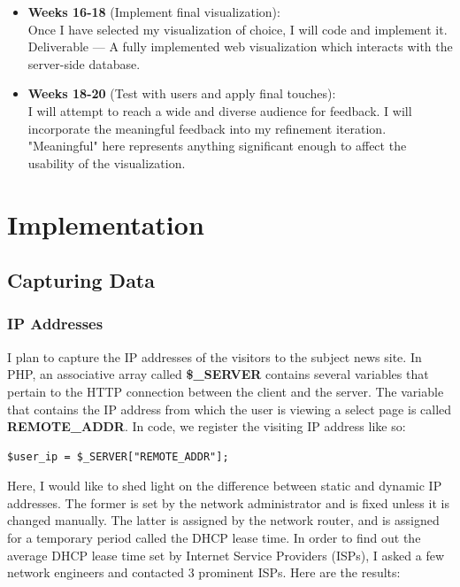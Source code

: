 \documentclass[12pt]{article}
\begin{document}
\begin{itemize}
\item[] \textbf{Weeks 16-18} (Implement final visualization): \\
Once I have selected my visualization of choice, I will code and implement it. \\
Deliverable --- A fully implemented web visualization which interacts with the server-side database.

\item[] \textbf{Weeks 18-20} (Test with users and apply final touches): \\
I will attempt to reach a wide and diverse audience for feedback. I will incorporate the meaningful feedback into my refinement iteration. "Meaningful" here represents anything significant enough to affect the usability of the visualization.

\end{itemize}

\vfill

\section{Implementation}
\subsection{Capturing Data}
\subsubsection{IP Addresses}
I plan to capture the IP addresses of the visitors to the subject news site. In PHP, an associative array called \textbf{\$\_SERVER}  contains several variables that pertain to the HTTP connection between the client and the server. The variable that contains the IP address from which the user is viewing a select page is called \textbf{REMOTE\_ADDR}. In code, we register the visiting IP address like so:
\begin{lstlisting}
$user_ip = $_SERVER["REMOTE_ADDR"];
\end{lstlisting}

Here, I would like to shed light on the difference between static and dynamic IP addresses. The former is set by the network administrator and is fixed unless it is changed manually. The latter is assigned by the network router, and is assigned for a temporary period called the DHCP lease time. In order to find out the average DHCP lease time set by Internet Service Providers (ISPs), I asked a few network engineers and contacted 3 prominent ISPs. Here are the results:
\vspace{0.3in}
\end{document}
